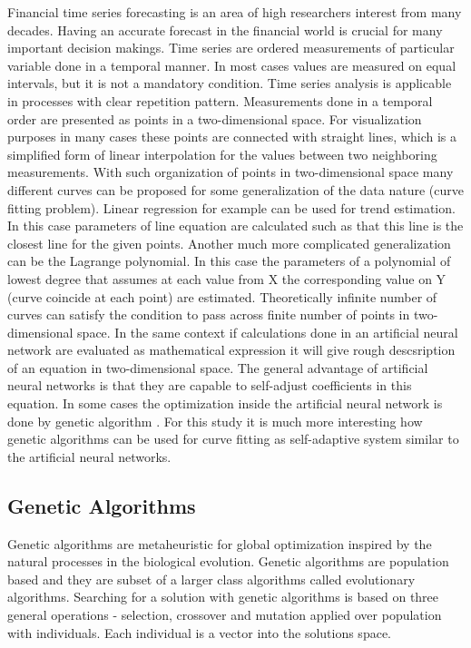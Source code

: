 \documentclass[graybox]{svmult}
\begin{document}
Financial time series forecasting is an area of high researchers interest \cite{nava01} from many decades. Having an accurate forecast in the financial world is crucial for many important decision makings. Time series are ordered measurements of particular variable done in a temporal manner. In most cases values are measured on equal intervals, but it is not a mandatory condition. Time series analysis is applicable in processes with clear repetition pattern. Measurements done in a temporal order are presented as points in a two-dimensional space. For visualization purposes in many cases these points are connected with straight lines, which is a simplified form of linear interpolation for the values between two neighboring measurements. With such organization of points in two-dimensional space many different curves can be proposed for some generalization of the data nature (curve fitting problem). Linear regression for example can be used for trend estimation. In this case parameters of line equation are calculated such as that this line is the closest line for the given points. Another much more complicated generalization can be the Lagrange polynomial. In this case the parameters of a polynomial of lowest degree that assumes at each value from X the corresponding value on Y (curve coincide at each point) are estimated. Theoretically infinite number of curves can satisfy the condition to pass across finite number of points in two-dimensional space. In the same context if calculations done in an artificial neural network are evaluated as mathematical expression it will give rough descsription of an equation in two-dimensional space. The general advantage of artificial neural networks is that they are capable to self-adjust coefficients \cite{aljarah01} in this equation. In some cases the optimization inside the artificial neural network is done by genetic algorithm \cite{zhang01,kapanova01}. For this study it is much more interesting how genetic algorithms can be used for curve fitting as self-adaptive system similar to the artificial neural networks. 

\subsection{Genetic Algorithms} \label{Genetic Algorithms}

Genetic algorithms are metaheuristic for global optimization inspired by the natural processes in the biological evolution. Genetic algorithms are population based and they are subset of a larger class algorithms called evolutionary algorithms. Searching for a solution with genetic algorithms is based on three general operations - selection, crossover and mutation applied over population with individuals. Each individual is a vector into the solutions space. 
\end{document}
